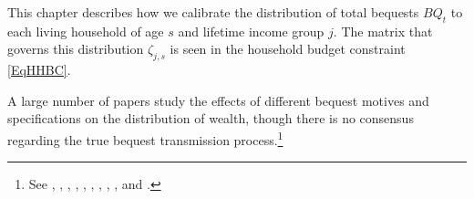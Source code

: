 
This chapter describes how we calibrate the distribution of total bequests $BQ_t$ to each living household of age $s$ and lifetime income group $j$. The matrix that governs this distribution $\zeta_{j,s}$ is seen in the household budget constraint \ref{EqHHBC}.

A large number of papers study the effects of different bequest motives and specifications on the distribution of wealth, though there is no consensus regarding the true bequest transmission process.\footnote{See \citet{DeNardiYang:2014}, \citet{DeNardi:2004}, \citet{Nishiyama:2002}, \citet{Laitner:2001}, \citet{GokhaleEtAl:2000}, \citet{GaleScholz:1994}, \citet{Hurd:1989}, \citet{VentiWise:1988}, \citet{KotlikoffSummers:1981}, and \citet{Wolff:2015}.}
